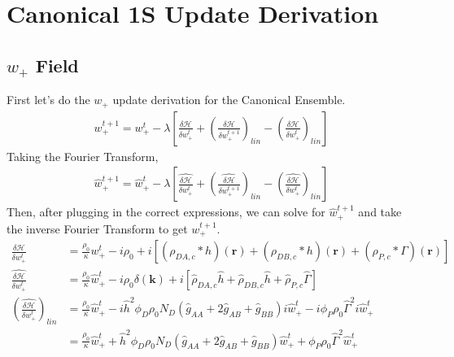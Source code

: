 \documentclass{article}
\begin{document}
\section{Canonical 1S Update Derivation}

\subsection{$w_+$ Field}

First let's do the $w_+$ update derivation for the Canonical Ensemble.
\begin{align*}
  w_+^{t+1} =
    w_+^t - \lambda \left[
      \frac{\delta \mathcal{H}}{\delta w_+^t}
      + \left(  \frac{\delta \mathcal{H}}{\delta w_+^{t+1}} \right) _{lin}
      - \left(  \frac{\delta \mathcal{H}}{\delta w_+^{t}} \right) _{lin}
    \right]
\end{align*}
Taking the Fourier Transform,
\begin{align*}
  \hat{w}_+^{t+1} =
    \hat{w}_+^t - \lambda \left[
      \hat{\frac{\delta \mathcal{H}}{\delta w_+^t}}
      + \left( \hat{ \frac{\delta \mathcal{H}}{\delta w_+^{t+1}}} \right) _{lin}
      - \left( \hat{ \frac{\delta \mathcal{H}}{\delta w_+^{t}}} \right) _{lin}
    \right]
\end{align*}
Then, after plugging in the correct expressions, we can solve for
  $\hat{w}_+^{t+1}$ and take the inverse Fourier Transform to get $w_+^{t+1}$.
\begin{align*}
  \frac{\delta \mathcal{H}}{\delta w_+^t} &=
    \frac{\rho_0}{\kappa} w_+^t
    - i\rho_0
    + i [ (\rho_{DA,c} \ast h)(\mathbf{r})
          + (\rho_{DB,c} \ast h)(\mathbf{r})
          + (\rho_{P,c} \ast \Gamma)(\mathbf{r}) ] \\
  \hat{\frac{\delta \mathcal{H}}{\delta w_+^t}} &=
    \frac{\rho_0}{\kappa} \hat{w}_+^t
    - i \rho_0 \delta(\mathbf{k})
    + i [ \hat{\rho}_{DA,c} \hat{h}
          + \hat{\rho}_{DB,c} \hat{h}
          + \hat{\rho}_{P,c}  \hat{\Gamma} ] \\
  \left( \hat{\frac{\delta \mathcal{H}}{\delta w_+^t}} \right) _{lin} &=
    \frac{\rho_0}{\kappa} \hat{w}_+^t
    - i \hat{h}^2 \phi_D \rho_0 N_D
      (\hat{g}_{AA} + 2 \hat{g}_{AB} + \hat{g}_{BB}) i \hat{w}_+^t
    - i \phi_P \rho_0 \hat{\Gamma}^2 i \hat{w}_+^t \\
  &= \frac{\rho_0}{\kappa} \hat{w}_+^t
    + \hat{h}^2 \phi_D \rho_0 N_D
      (\hat{g}_{AA} + 2 \hat{g}_{AB} + \hat{g}_{BB}) \hat{w}_+^t
    + \phi_P \rho_0 \hat{\Gamma}^2 \hat{w}_+^t
\end{align*}
\end{document}
